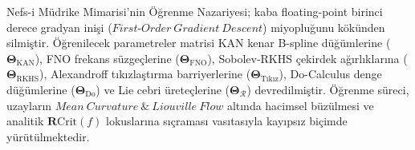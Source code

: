 \documentclass[11pt, a4paper]{article}
\begin{document}
Nefs-i Müdrike Mimarisi'nin Öğrenme Nazariyesi; kaba floating-point birinci derece gradyan inişi ($First\text{-}Order\ Gradient\ Descent$) miyopluğunu kökünden silmiştir. Öğrenilecek parametreler matrisi KAN kenar B-spline düğümlerine ($\bm{\Theta}_{\text{KAN}}$), FNO frekans süzgeçlerine ($\bm{\Theta}_{\text{FNO}}$), Sobolev-RKHS çekirdek ağırlıklarına ($\bm{\Theta}_{\text{RKHS}}$), Alexandroff tıkızlaştırma barriyerlerine ($\bm{\Theta}_{\text{Tıkız}}$), Do-Calculus denge düğümlerine ($\bm{\Theta}_{\text{Do}}$) ve Lie cebri üreteçlerine ($\bm{\Theta}_{\mathcal{R}}$) devredilmiştir. Öğrenme süreci, uzayların $Mean\ Curvature\ \&\ Liouville\ Flow$ altında hacimsel büzülmesi ve analitik $\mathbf{R}\text{Crit}(f)$ lokuslarına sıçraması vasıtasıyla kayıpsız biçimde yürütülmektedir.
\end{document}
